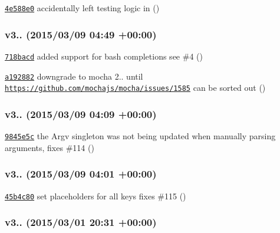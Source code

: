 \begin{DoxyItemize}
\item \href{https://github.com/bcoe/yargs/commit/4e588e055afbeb9336533095f051496e3977f515}{\tt 4e588e0} accidentally left testing logic in ()
\end{DoxyItemize}

\subsubsection*{v3.. (2015/03/09 04\+:49 +00\+:00)}


\begin{DoxyItemize}
\item \href{https://github.com/bcoe/yargs/commit/718bacd81b9b44f786af76b2afe491fe06274f19}{\tt 718bacd} added support for bash completions see \#4 ()
\item \href{https://github.com/bcoe/yargs/commit/a19288270fc431396c42af01125eeb4443664528}{\tt a192882} downgrade to mocha 2.. until \href{https://github.com/mochajs/mocha/issues/1585}{\tt https\+://github.\+com/mochajs/mocha/issues/1585} can be sorted out ()
\end{DoxyItemize}

\subsubsection*{v3.. (2015/03/09 04\+:09 +00\+:00)}


\begin{DoxyItemize}
\item \href{https://github.com/bcoe/yargs/commit/9845e5c1a9c684ba0be3f0bfb40e7b62ab49d9c8}{\tt 9845e5c} the Argv singleton was not being updated when manually parsing arguments, fixes \#114 ()
\end{DoxyItemize}

\subsubsection*{v3.. (2015/03/09 04\+:01 +00\+:00)}


\begin{DoxyItemize}
\item \href{https://github.com/bcoe/yargs/commit/45b4c80b890d02770b0a94f326695a8a566e8fe9}{\tt 45b4c80} set placeholders for all keys fixes \#115 ()
\end{DoxyItemize}

\subsubsection*{v3.. (2015/03/01 20\+:31 +00\+:00)}


